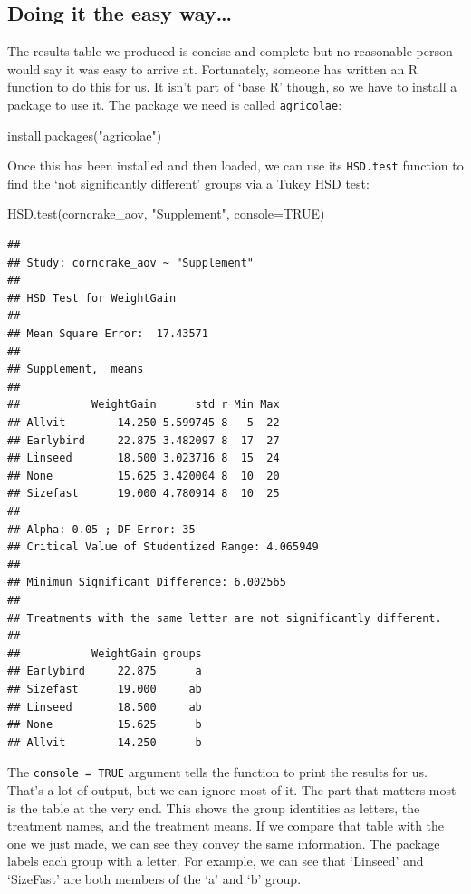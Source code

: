 \documentclass[
]{book}
\newenvironment{Shaded}{\begin{snugshade}}{\end{snugshade}}
\newcommand{\AttributeTok}[1]{\textcolor[rgb]{0.77,0.63,0.00}{#1}}
\newcommand{\ConstantTok}[1]{\textcolor[rgb]{0.00,0.00,0.00}{#1}}
\newcommand{\FunctionTok}[1]{\textcolor[rgb]{0.00,0.00,0.00}{#1}}
\newcommand{\NormalTok}[1]{#1}
\newcommand{\StringTok}[1]{\textcolor[rgb]{0.31,0.60,0.02}{#1}}
\begin{document}
\hypertarget{doing-it-the-easy-way}{%
\subsection{Doing it the easy way\ldots{}}\label{doing-it-the-easy-way}}

The results table we produced is concise and complete but no reasonable person would say it was easy to arrive at. Fortunately, someone has written an R function to do this for us. It isn't part of `base R' though, so we have to install a package to use it. The package we need is called \texttt{agricolae}:

\begin{Shaded}
\begin{Highlighting}[]
\FunctionTok{install.packages}\NormalTok{(}\StringTok{"agricolae"}\NormalTok{)}
\end{Highlighting}
\end{Shaded}

Once this has been installed and then loaded, we can use its \texttt{HSD.test} function to find the `not significantly different' groups via a Tukey HSD test:

\begin{Shaded}
\begin{Highlighting}[]
\FunctionTok{HSD.test}\NormalTok{(corncrake\_aov, }\StringTok{"Supplement"}\NormalTok{, }\AttributeTok{console=}\ConstantTok{TRUE}\NormalTok{)}
\end{Highlighting}
\end{Shaded}

\begin{verbatim}
## 
## Study: corncrake_aov ~ "Supplement"
## 
## HSD Test for WeightGain 
## 
## Mean Square Error:  17.43571 
## 
## Supplement,  means
## 
##           WeightGain      std r Min Max
## Allvit        14.250 5.599745 8   5  22
## Earlybird     22.875 3.482097 8  17  27
## Linseed       18.500 3.023716 8  15  24
## None          15.625 3.420004 8  10  20
## Sizefast      19.000 4.780914 8  10  25
## 
## Alpha: 0.05 ; DF Error: 35 
## Critical Value of Studentized Range: 4.065949 
## 
## Minimun Significant Difference: 6.002565 
## 
## Treatments with the same letter are not significantly different.
## 
##           WeightGain groups
## Earlybird     22.875      a
## Sizefast      19.000     ab
## Linseed       18.500     ab
## None          15.625      b
## Allvit        14.250      b
\end{verbatim}

The \texttt{console\ =\ TRUE} argument tells the function to print the results for us. That's a lot of output, but we can ignore most of it. The part that matters most is the table at the very end. This shows the group identities as letters, the treatment names, and the treatment means. If we compare that table with the one we just made, we can see they convey the same information. The package labels each group with a letter. For example, we can see that `Linseed' and `SizeFast' are both members of the `a' and `b' group.
\end{document}

